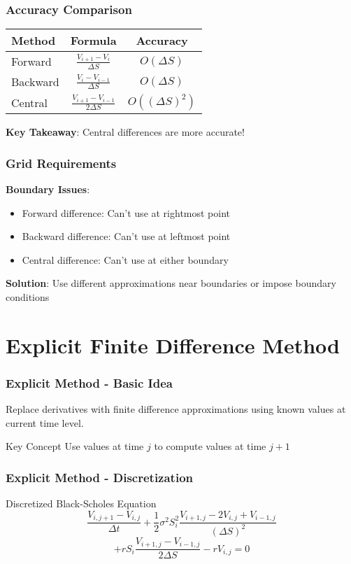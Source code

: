 \documentclass[aspectratio=169]{beamer}
\begin{document}
\begin{frame}
\frametitle{Accuracy Comparison}
\begin{center}
\begin{tabular}{lcc}
\toprule
\textbf{Method} & \textbf{Formula} & \textbf{Accuracy} \\
\midrule
Forward & $\frac{V_{i+1} - V_i}{\Delta S}$ & $O(\Delta S)$ \\
Backward & $\frac{V_i - V_{i-1}}{\Delta S}$ & $O(\Delta S)$ \\
Central & $\frac{V_{i+1} - V_{i-1}}{2\Delta S}$ & $O((\Delta S)^2)$ \\
\bottomrule
\end{tabular}
\end{center}

\textbf{Key Takeaway}: Central differences are more accurate!
\end{frame}

\begin{frame}
\frametitle{Grid Requirements}
\textbf{Boundary Issues}:
\begin{itemize}
\item Forward difference: Can't use at rightmost point
\item Backward difference: Can't use at leftmost point  
\item Central difference: Can't use at either boundary
\end{itemize}

\textbf{Solution}: Use different approximations near boundaries or impose boundary conditions
\end{frame}

\section{Explicit Finite Difference Method}

\begin{frame}
\frametitle{Explicit Method - Basic Idea}
Replace derivatives with finite difference approximations using known values at current time level.

\begin{block}{Key Concept}
Use values at time $j$ to compute values at time $j+1$
\end{block}
\end{frame}

\begin{frame}
\frametitle{Explicit Method - Discretization}
\begin{block}{Discretized Black-Scholes Equation}
\[\frac{V_{i,j+1} - V_{i,j}}{\Delta t} + \frac{1}{2}\sigma^2 S_i^2 \frac{V_{i+1,j} - 2V_{i,j} + V_{i-1,j}}{(\Delta S)^2}\]
\[+ rS_i \frac{V_{i+1,j} - V_{i-1,j}}{2\Delta S} - rV_{i,j} = 0\]
\end{block}
\end{frame}
\end{document}

